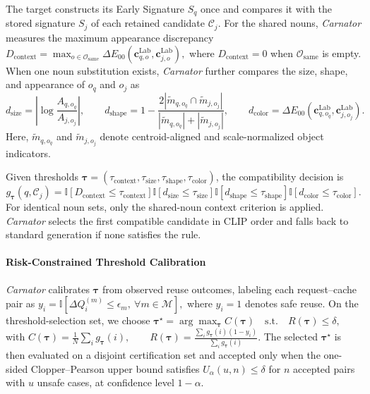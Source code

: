 The target constructs its Early Signature $S_q$ once and compares it with the stored signature $S_j$ of each retained candidate $\mathcal{C}_j$.
For the shared nouns, \emph{Carnator} measures the maximum appearance discrepancy
$
D_{\mathrm{context}}
=
\max_{o\in\mathcal{O}_{\mathrm{same}}}
\Delta E_{00}
\left(
\mathbf{c}^{\mathrm{Lab}}_{q,o},
\mathbf{c}^{\mathrm{Lab}}_{j,o}
\right),
$
where $D_{\mathrm{context}}=0$ when $\mathcal{O}_{\mathrm{same}}$ is empty.
When one noun substitution exists, \emph{Carnator} further compares the size, shape, and appearance of $o_q$ and $o_j$ as
\[
d_{\mathrm{size}}
=
\left|
\log\frac{A_{q,o_q}}{A_{j,o_j}}
\right|,
\qquad
d_{\mathrm{shape}}
=
1-
\frac{
2|\widetilde{m}_{q,o_q}\cap\widetilde{m}_{j,o_j}|
}{
|\widetilde{m}_{q,o_q}|+|\widetilde{m}_{j,o_j}|
},
\qquad
d_{\mathrm{color}}
=
\Delta E_{00}
\left(
\mathbf{c}^{\mathrm{Lab}}_{q,o_q},
\mathbf{c}^{\mathrm{Lab}}_{j,o_j}
\right).
\]
Here, $\widetilde{m}_{q,o_q}$ and $\widetilde{m}_{j,o_j}$ denote centroid-aligned and scale-normalized object indicators.

Given thresholds
$\boldsymbol{\tau}
=
(\tau_{\mathrm{context}},
\tau_{\mathrm{size}},
\tau_{\mathrm{shape}},
\tau_{\mathrm{color}})$,
the compatibility decision is
\[
g_{\boldsymbol{\tau}}(q,\mathcal{C}_j)
=
\mathbb{I}[D_{\mathrm{context}}\leq\tau_{\mathrm{context}}]
\mathbb{I}[d_{\mathrm{size}}\leq\tau_{\mathrm{size}}]
\mathbb{I}[d_{\mathrm{shape}}\leq\tau_{\mathrm{shape}}]
\mathbb{I}[d_{\mathrm{color}}\leq\tau_{\mathrm{color}}].
\]
For identical noun sets, only the shared-noun context criterion is applied.
\emph{Carnator} selects the first compatible candidate in CLIP order and falls back to standard generation if none satisfies the rule.

\paragraph{Risk-Constrained Threshold Calibration}
\emph{Carnator} calibrates $\boldsymbol{\tau}$ from observed reuse outcomes, labeling each request--cache pair as
$
y_i=
\mathbb{I}
[\Delta Q_i^{(m)}\leq\epsilon_m,\ \forall m\in\mathcal{M}],
$
where $y_i=1$ denotes safe reuse.
On the threshold-selection set, we choose
 $
\boldsymbol{\tau}^{\star}
=
\arg\max_{\boldsymbol{\tau}} C(\boldsymbol{\tau})
\quad
\mathrm{s.t.}
\quad
R(\boldsymbol{\tau})\leq\delta,
\label{eq_threshold_calibration}
$
with
$
C(\boldsymbol{\tau})
=
\frac{1}{N}\sum_i g_{\boldsymbol{\tau}}(i),
\qquad
R(\boldsymbol{\tau})
=
\frac{\sum_i g_{\boldsymbol{\tau}}(i)(1-y_i)}
{\sum_i g_{\boldsymbol{\tau}}(i)}.
$
The selected $\boldsymbol{\tau}^{\star}$ is then evaluated on a disjoint certification set and accepted only when the one-sided Clopper--Pearson upper bound satisfies
$U_{\alpha}(u,n)\leq\delta$
for $n$ accepted pairs with $u$ unsafe cases, at confidence level $1-\alpha$.

